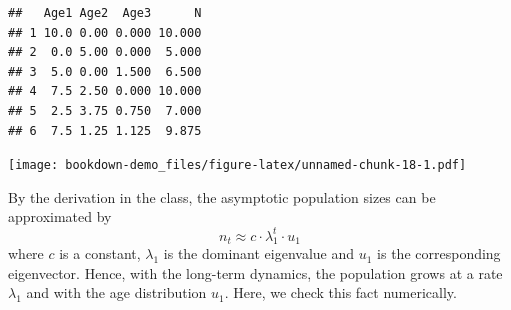 \documentclass[
]{book}
\newenvironment{Shaded}{\begin{snugshade}}{\end{snugshade}}
\newcommand{\AttributeTok}[1]{\textcolor[rgb]{0.13,0.29,0.53}{#1}}
\newcommand{\DecValTok}[1]{\textcolor[rgb]{0.00,0.00,0.81}{#1}}
\newcommand{\DocumentationTok}[1]{\textcolor[rgb]{0.56,0.35,0.01}{\textbf{\textit{#1}}}}
\newcommand{\FunctionTok}[1]{\textcolor[rgb]{0.13,0.29,0.53}{\textbf{#1}}}
\newcommand{\NormalTok}[1]{#1}
\newcommand{\OtherTok}[1]{\textcolor[rgb]{0.56,0.35,0.01}{#1}}
\newcommand{\SpecialCharTok}[1]{\textcolor[rgb]{0.81,0.36,0.00}{\textbf{#1}}}
\newcommand{\StringTok}[1]{\textcolor[rgb]{0.31,0.60,0.02}{#1}}
\begin{document}
\begin{verbatim}
##   Age1 Age2  Age3      N
## 1 10.0 0.00 0.000 10.000
## 2  0.0 5.00 0.000  5.000
## 3  5.0 0.00 1.500  6.500
## 4  7.5 2.50 0.000 10.000
## 5  2.5 3.75 0.750  7.000
## 6  7.5 1.25 1.125  9.875
\end{verbatim}

\begin{Shaded}
\end{Shaded}

\texttt{[image: bookdown-demo\_files/figure-latex/unnamed-chunk-18-1.pdf]}

By the derivation in the class, the asymptotic population sizes can be approximated by
\[
n_t \approx c\cdot \lambda_1^t\cdot u_1
\]
where \(c\) is a constant, \(\lambda_1\) is the dominant eigenvalue and \(u_1\) is the corresponding eigenvector. Hence, with the long-term dynamics, the population grows at a rate \(\lambda_1\) and with the age distribution \(u_1\). Here, we check this fact numerically.

\begin{Shaded}
\end{Shaded}
\end{document}
